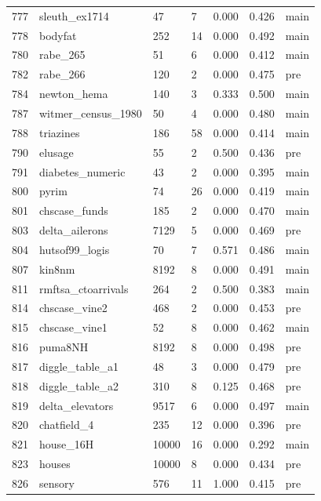 \begin{table}[!htb]
\begin{tabular}{l | l | l | l | l | l | l}
777 & sleuth\_ex1714 & 47 & 7 & 0.000 & 0.426 & main \\
778 & bodyfat & 252 & 14 & 0.000 & 0.492 & main \\
780 & rabe\_265 & 51 & 6 & 0.000 & 0.412 & main \\
782 & rabe\_266 & 120 & 2 & 0.000 & 0.475 & pre \\
784 & newton\_hema & 140 & 3 & 0.333 & 0.500 & main \\
787 & witmer\_census\_1980 & 50 & 4 & 0.000 & 0.480 & main \\
788 & triazines & 186 & 58 & 0.000 & 0.414 & main \\
790 & elusage & 55 & 2 & 0.500 & 0.436 & pre \\
791 & diabetes\_numeric & 43 & 2 & 0.000 & 0.395 & main \\
800 & pyrim & 74 & 26 & 0.000 & 0.419 & main \\
801 & chscase\_funds & 185 & 2 & 0.000 & 0.470 & main \\
803 & delta\_ailerons & 7129 & 5 & 0.000 & 0.469 & pre \\
804 & hutsof99\_logis & 70 & 7 & 0.571 & 0.486 & main \\
807 & kin8nm & 8192 & 8 & 0.000 & 0.491 & main \\
811 & rmftsa\_ctoarrivals & 264 & 2 & 0.500 & 0.383 & main \\
814 & chscase\_vine2 & 468 & 2 & 0.000 & 0.453 & pre \\
815 & chscase\_vine1 & 52 & 8 & 0.000 & 0.462 & main \\
816 & puma8NH & 8192 & 8 & 0.000 & 0.498 & pre \\
817 & diggle\_table\_a1 & 48 & 3 & 0.000 & 0.479 & pre \\
818 & diggle\_table\_a2 & 310 & 8 & 0.125 & 0.468 & pre \\
819 & delta\_elevators & 9517 & 6 & 0.000 & 0.497 & main \\
820 & chatfield\_4 & 235 & 12 & 0.000 & 0.396 & pre \\
821 & house\_16H & 10000 & 16 & 0.000 & 0.292 & main \\
823 & houses & 10000 & 8 & 0.000 & 0.434 & pre \\
826 & sensory & 576 & 11 & 1.000 & 0.415 & pre \\
\end{tabular}
\end{table}
